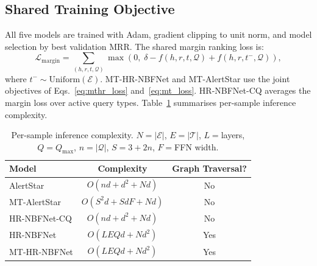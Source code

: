 \documentclass[10pt,journal,compsoc]{IEEEtran}
\begin{document}
\subsection{Shared Training Objective}
\label{ssec:training}

All five models are trained with Adam, gradient
clipping to unit norm, and model selection by best
validation MRR. The shared margin ranking loss is:
\begin{equation}
  \mathcal{L}_{\mathrm{margin}}
  = \sum_{(h,r,t,\mathcal{Q})}
    \max\!\left(0,\;
      \delta
      - f(h,r,t,\mathcal{Q})
      + f(h,r,t^-,\mathcal{Q})
    \right),
  \label{eq:margin_loss_shared}
\end{equation}
where $t^- \sim \mathrm{Uniform}(\mathcal{E})$.
MT-HR-NBFNet and MT-AlertStar use the joint objectives
of Eqs.~\ref{eq:mthr_loss} and~\ref{eq:mt_loss}.
HR-NBFNet-CQ averages the margin loss over active
query types. Table~\ref{tab:complexity} summarises
per-sample inference complexity.

\begin{table}[t]

\centering
\caption{Per-sample inference complexity.
  $N{=}|\mathcal{E}|$, $E{=}|\mathcal{T}|$,
  $L{=}$layers, $Q{=}Q_{\max}$,
  $n{=}|\mathcal{Q}|$, $S{=}3{+}2n$,
  $F{=}$FFN width.}
\label{tab:complexity}
\renewcommand{\arraystretch}{1.2}
\begin{tabular}{lcc}

\toprule
\textbf{Model} & \textbf{Complexity}
  & \textbf{Graph Traversal?} \\
\midrule
AlertStar       & $O(nd + d^2 + Nd)$        & No  \\
MT-AlertStar    & $O(S^2d + SdF + Nd)$      & No  \\
HR-NBFNet-CQ    & $O(nd + d^2 + Nd)$        & No  \\
HR-NBFNet       & $O(LEQd + Nd^2)$          & Yes \\
MT-HR-NBFNet    & $O(LEQd + Nd^2)$          & Yes \\
\bottomrule
\end{tabular}
\end{table}





\end{document}

